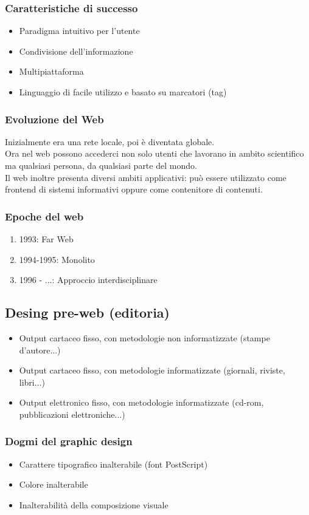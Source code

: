 \documentclass{article}
\begin{document}
\subsubsection{Caratteristiche di successo}
\begin{itemize}
\item Paradigma intuitivo per l'utente
\item Condivisione dell'informazione
\item Multipiattaforma
\item Linguaggio di facile utilizzo e basato su marcatori (tag)
\end{itemize}
\subsubsection{Evoluzione del Web}
Inizialmente era una rete locale, poi è diventata globale.\\
Ora nel web possono accederci non solo utenti che lavorano in ambito scientifico ma qualsiasi persona, da qualsiasi parte del mondo.\\
Il web inoltre presenta diversi ambiti applicativi: può essere utilizzato come frontend di sistemi informativi oppure come contenitore di contenuti.
\subsubsection{Epoche del web}
\begin{enumerate}
\item 1993: Far Web
\item 1994-1995: Monolito
\item 1996 - ...: Approccio interdisciplinare
\end{enumerate}
\subsection{Desing pre-web (editoria)}
\begin{itemize}
\item Output cartaceo fisso, con metodologie non informatizzate (stampe d'autore...)
\item Output cartaceo fisso, con metodologie informatizzate (giornali, riviste, libri...)
\item Output elettronico fisso, con metodologie informatizzate (cd-rom, pubblicazioni elettroniche...)
\end{itemize}
\subsubsection{Dogmi del graphic design}
\begin{itemize}
\item Carattere tipografico inalterabile (font PostScript)
\item Colore inalterabile
\item Inalterabilità della composizione visuale
\end{itemize}
\end{document}
